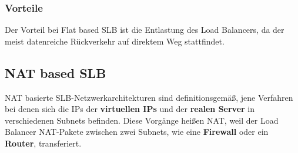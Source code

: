 \subsubsection{Vorteile}
Der Vorteil bei Flat based SLB ist die Entlastung des Load Balancers, da der meist datenreiche Rückverkehr auf direktem Weg stattfindet.

\newpage
\subsection{NAT based SLB}\cite{SLBbook}

NAT basierte SLB-Netzwerkarchitekturen sind definitionsgemäß, jene Verfahren bei denen sich die IPs der \textbf{virtuellen IPs} und der \textbf{realen Server} in verschiedenen Subnets befinden. Diese Vorgänge heißen NAT, weil der Load Balancer NAT-Pakete zwischen zwei Subnets, wie eine \textbf{Firewall} oder ein \textbf{Router}, transferiert.

